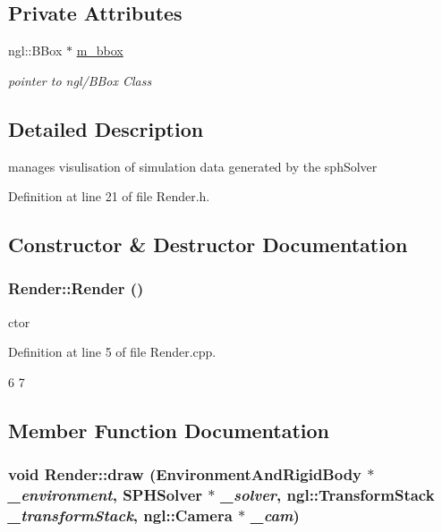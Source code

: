 \subsection*{Private Attributes}
\begin{DoxyCompactItemize}
\item 
ngl::BBox $\ast$ \hyperlink{class_render_a5e571da11a215f0eee9b0f44f2a77fb4}{m\_\-bbox}
\begin{DoxyCompactList}\small\item\em pointer to ngl/BBox Class \item\end{DoxyCompactList}\end{DoxyCompactItemize}


\subsection{Detailed Description}
manages visulisation of simulation data generated by the sphSolver 

Definition at line 21 of file Render.h.



\subsection{Constructor \& Destructor Documentation}
\hypertarget{class_render_a8610cc11739ef679b5935dd819021351}{
\subsubsection[{Render}]{\setlength{\rightskip}{0pt plus 5cm}Render::Render ()}}
\label{class_render_a8610cc11739ef679b5935dd819021351}


ctor 



Definition at line 5 of file Render.cpp.




\begin{DoxyCode}
6 {
7 }
\end{DoxyCode}




\subsection{Member Function Documentation}
\hypertarget{class_render_abff096b6a70647c4e22272f51df53417}{
\subsubsection[{draw}]{\setlength{\rightskip}{0pt plus 5cm}void Render::draw ({\bf EnvironmentAndRigidBody} $\ast$ {\em \_\-environment}, \/  {\bf SPHSolver} $\ast$ {\em \_\-solver}, \/  ngl::TransformStack {\em \_\-transformStack}, \/  ngl::Camera $\ast$ {\em \_\-cam})}}
\label{class_render_abff096b6a70647c4e22272f51df53417}


